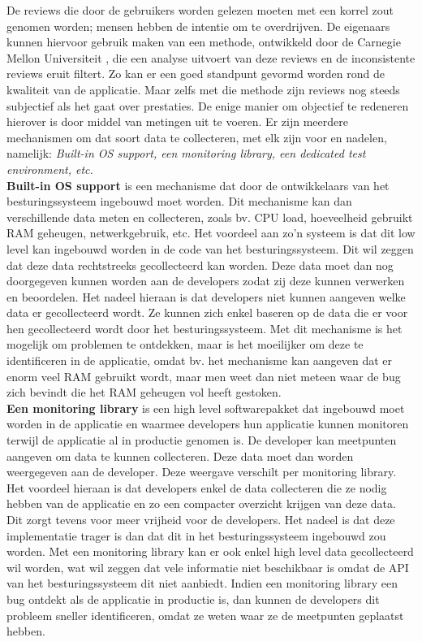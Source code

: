 De reviews die door de gebruikers worden gelezen moeten met een korrel zout genomen worden; mensen hebben de intentie om te overdrijven. De eigenaars kunnen hiervoor gebruik maken van een methode, ontwikkeld door de Carnegie Mellon Universiteit \cite{fu2013people}, die een analyse uitvoert van deze reviews en de inconsistente reviews eruit filtert. Zo kan er een goed standpunt gevormd worden rond de kwaliteit van de applicatie. Maar zelfs met die methode zijn reviews nog steeds subjectief als het gaat over prestaties. De enige manier om objectief te redeneren hierover is door middel van metingen uit te voeren. Er zijn meerdere mechanismen om dat soort data te collecteren, met elk zijn voor en nadelen, namelijk: \textit{Built-in OS support, een monitoring library, een dedicated test environment, etc.}\\

\textbf{Built-in OS support} is een mechanisme dat door de ontwikkelaars van het besturingssysteem ingebouwd moet worden. Dit mechanisme kan dan verschillende data meten en collecteren, zoals bv. CPU load, hoeveelheid gebruikt RAM geheugen, netwerkgebruik, etc. Het voordeel aan zo'n systeem is dat dit low level kan ingebouwd worden in de code van het besturingssysteem. Dit wil zeggen dat deze data rechtstreeks gecollecteerd kan worden. Deze data moet dan nog doorgegeven kunnen worden aan de developers zodat zij deze kunnen verwerken en beoordelen. Het nadeel hieraan is dat developers niet kunnen aangeven welke data er gecollecteerd wordt. Ze kunnen zich enkel baseren op de data die er voor hen gecollecteerd wordt door het besturingssysteem. Met dit mechanisme is het mogelijk om problemen te ontdekken, maar is het moeilijker om deze te identificeren in de applicatie, omdat bv. het mechanisme kan aangeven dat er enorm veel RAM gebruikt wordt, maar men weet dan niet meteen waar de bug zich bevindt die het RAM geheugen vol heeft gestoken.\\

\textbf{Een monitoring library} is een high level softwarepakket dat ingebouwd moet worden in de applicatie en waarmee developers hun applicatie kunnen monitoren terwijl de applicatie al in productie genomen is. De developer kan meetpunten aangeven om data te kunnen collecteren. Deze data moet dan worden weergegeven aan de developer. Deze weergave verschilt per monitoring library. Het voordeel hieraan is dat developers enkel de data collecteren die ze nodig hebben van de applicatie en zo een compacter overzicht krijgen van deze data. Dit zorgt tevens voor meer vrijheid voor de developers. Het nadeel is dat deze implementatie trager is dan dat dit in het besturingssysteem ingebouwd zou worden. Met een monitoring library kan er ook enkel high level data gecollecteerd wil worden, wat wil zeggen dat vele informatie niet beschikbaar is omdat de API van het besturingssysteem dit niet aanbiedt. Indien een monitoring library een bug ontdekt als de applicatie in productie is, dan kunnen de developers dit probleem sneller identificeren, omdat ze weten waar ze de meetpunten geplaatst hebben. \\


